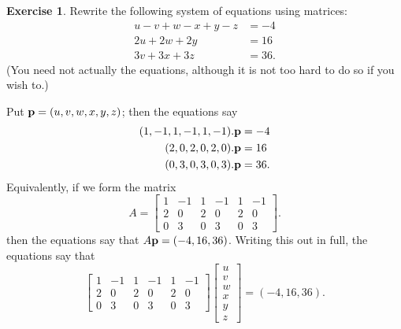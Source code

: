 \documentclass[a4paper]{book}
\theoremstyle{definition}
\newtheorem{exercise}[theorem]{Exercise}
\renewenvironment{solution}{\SolutionInline}{\endSolutionInline}
\begin{document}
\begin{exercise}
 Rewrite the following system of equations using matrices:
 \begin{align*}
  u-v+w-x+y-z &= -4 \\
  2u+2w+2y    &= 16 \\
  3v+3x+3z    &= 36.
 \end{align*}
 (You need not actually  the equations, although it is not
 too hard to do so if you wish to.)
\end{exercise}
\begin{solution}
 Put $\mathbf{p}=(u,v,w,x,y,z)$; then the equations say
 \begin{align*}
  ( 1,-1, 1,-1, 1,-1).\mathbf{p} &= -4 \\
  ( 2, 0, 2, 0, 2, 0).\mathbf{p} &= 16 \\
  ( 0, 3, 0, 3, 0, 3).\mathbf{p} &= 36.
 \end{align*}
 Equivalently, if we form the matrix
 \[ A = 
    \begin{bmatrix}
      1 & -1 &  1 & -1 &  1 & -1 \\
      2 &  0 &  2 &  0 &  2 &  0 \\
      0 &  3 &  0 &  3 &  0 &  3
    \end{bmatrix}.
 \]
 then the equations say that $A\mathbf{p}=(-4,16,36)$.  Writing this out
 in full, the equations say that
 {\small \[ \begin{bmatrix}
      1 & -1 &  1 & -1 &  1 & -1 \\
      2 &  0 &  2 &  0 &  2 &  0 \\
      0 &  3 &  0 &  3 &  0 &  3
    \end{bmatrix}
    \begin{bmatrix}
      u \\ v \\ w \\ x \\ y \\ z
    \end{bmatrix} = 
    (-4,16,36).
 \]}
\end{solution}
\end{document}
